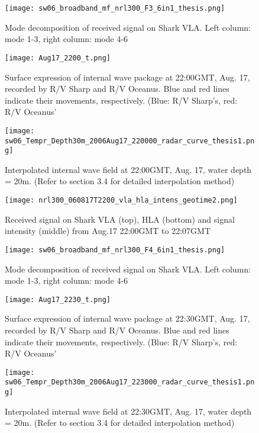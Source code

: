 \begin{figure}[H]
  \centering
  \texttt{[image: sw06\_broadband\_mf\_nrl300\_F3\_6in1\_thesis.png]}
  \caption{Mode decomposition of received signal on Shark VLA. 
    Left column: mode 1-3, right column: mode 4-6 }\label{fig:m2130}
\end{figure}
\clearpage

\begin{figure}[H]
  \centering
  \texttt{[image: Aug17\_2200\_t.png]}
  \caption{Surface expression of internal wave package at 22:00GMT, Aug. 17, recorded by R/V Sharp and R/V Oceanus. Blue and red lines indicate their movements, respectively. (Blue: R/V Sharp's, red: R/V Oceanus'}\label{fig:r2200_r}
\end{figure}

\begin{figure}[H]
  \centering
  \texttt{[image: sw06\_Tempr\_Depth30m\_2006Aug17\_220000\_radar\_curve\_thesis1.png]}
  \caption{Interpolated internal wave field at 22:00GMT, Aug. 17, water depth = 20m. (Refer to section 3.4 for detailed interpolation method)}\label{fig:r2200_i}
\end{figure}

\begin{figure}[H]
  \centering
  \texttt{[image: nrl300\_060817T2200\_vla\_hla\_intens\_geotime2.png]}
  \caption{Received signal on Shark VLA (top), HLA (bottom) and signal intensity (middle) from Aug.17 22:00GMT to 22:07GMT }\label{fig:a2200}
\end{figure}

\begin{figure}[H]
  \centering
  \texttt{[image: sw06\_broadband\_mf\_nrl300\_F4\_6in1\_thesis.png]}
  \caption{Mode decomposition of received signal on Shark VLA. 
    Left column: mode 1-3, right column: mode 4-6 }\label{fig:m2200}
\end{figure}


\begin{figure}[H]
  \centering
  \texttt{[image: Aug17\_2230\_t.png]}
  \caption{Surface expression of internal wave package at 22:30GMT, Aug. 17, recorded by R/V Sharp and R/V Oceanus. Blue and red lines indicate their movements, respectively. (Blue: R/V Sharp's, red: R/V Oceanus'}\label{fig:r2230_r}
\end{figure}

\begin{figure}[H]
 \centering
 \texttt{[image: sw06\_Tempr\_Depth30m\_2006Aug17\_223000\_radar\_curve\_thesis1.png]}
 \caption{Interpolated internal wave field at 22:30GMT, Aug. 17, water depth = 20m. (Refer to section 3.4 for detailed interpolation method)}\label{fig:r2230_i}
\end{figure}

